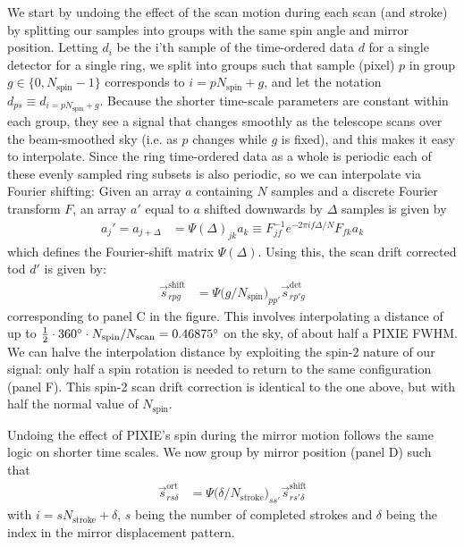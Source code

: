 \documentclass{article}
\begin{document}
We start by undoing the effect of the scan motion during each scan (and stroke)
by splitting our samples into groups with the same spin angle and mirror position.
Letting $d_i$ be the i'th sample of the time-ordered data $d$ for a single detector
for a single ring, we split into groups such that
sample (pixel) $p$ in group $g \in \{0,N_\textrm{spin}-1\}$ corresponds to
$i = pN_\textrm{spin}+g$, and let the notation $d_{ps} \equiv d_{i=pN_\textrm{spin}+g}$.
Because the shorter time-scale parameters are constant within each group, they see
a signal that changes smoothly as the telescope scans over the beam-smoothed sky
(i.e. as $p$ changes while $g$ is fixed),
and this makes it easy to interpolate. Since the ring time-ordered data as a whole
is periodic each of these evenly sampled ring subsets is also periodic, so we
can interpolate via Fourier shifting: Given an array $a$ containing $N$ samples and a discrete Fourier transform $F$,
an array $a'$ equal to $a$ shifted downwards by $\Delta$ samples is given by
\begin{align}
	a_j' = a_{j+\Delta} &= \Psi(\Delta)_{jk} a_k \equiv F^{-1}_{jf} e^{-2\pi if\Delta/N} F_{fk} a_k
\end{align}
which defines the Fourier-shift matrix $\Psi(\Delta)$. Using this,
the scan drift corrected tod $d'$ is given by:
\begin{align}
	\vec s^\textrm{shift}_{rpg} &= \Psi\big(g/N_\textrm{spin}\big)_{pp'} \vec s^\textrm{det}_{rp'g}
\end{align}
corresponding to panel C in the figure. This involves interpolating
a distance of up to $\frac12\cdot 360\degree\cdot N_\textrm{spin}/N_\textrm{scan}
= 0.46875\degree$ on the sky, of about half a PIXIE FWHM. We can halve the
interpolation distance by exploiting the spin-2 nature of our signal:
only half a spin rotation is needed to return to the same configuration (panel F).
This spin-2 scan drift correction is identical to the one above, but with
half the normal value of $N_\textrm{spin}$.

Undoing the effect of PIXIE's spin during the mirror motion follows the same
logic on shorter time scales. We now group by mirror position (panel D)
such that
\begin{align}
	\vec s^\textrm{ort}_{rs\delta} &= \Psi\big(\delta/N_\textrm{stroke}\big)_{ss'} \vec s^\textrm{shift}_{rs'\delta}
\end{align}
with $i = sN_\textrm{stroke}+\delta$, $s$ being the number of completed strokes
and $\delta$ being the index in the mirror displacement pattern.
\end{document}
